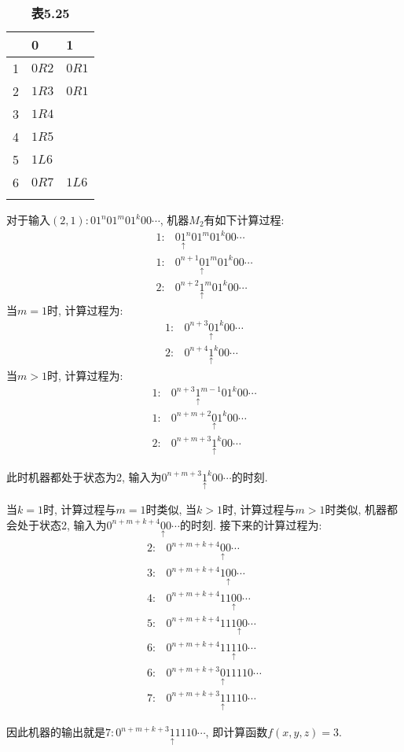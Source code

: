 \begin{table}[H]
\centering
\caption*{\textbf{表5.25}}
\begin{tabularx}{\textwidth}{Y|Y|Y}
\thickhline
&0&1\\
&$0R2$&$0R1$\\
&$1R3$&$0R1$\\
&$1R4$&\\
&$1R5$&\\
&$1L6$&\\
&$0R7$&$1L6$\\
\thickhline
\end{tabularx}
\end{table}

\begin{solution}
对于输入$(2,1):01^n01^m01^k00\cdots$, 机器$M_2$有如下计算过程:
\begin{align}
    1:&0\underset{\uparrow}{1}^n01^m01^k00\cdots\tag{0R1}\\
    1:&0^{n+1}\underset{\uparrow}{0}1^m01^k00\cdots\tag{0R2}\\
    2:&0^{n+2}\underset{\uparrow}{1}^{m}01^k00\cdots\tag{0R1}
\end{align}
当$m=1$时, 计算过程为:
\begin{align}
    1:&0^{n+3}\underset{\uparrow}{0}1^k00\cdots\tag{0R2}\\
    2:&0^{n+4}\underset{\uparrow}{1}^k00\cdots\tag{0R1}
\end{align}
当$m>1$时, 计算过程为:
\begin{align}
    1:&0^{n+3}\underset{\uparrow}{1}^{m-1}01^k00\cdots\tag{0R1}\\
    1:&0^{n+m+2}\underset{\uparrow}{0}1^k00\cdots\tag{0R2}\\
    2:&0^{n+m+3}\underset{\uparrow}{1}^k00\cdots\tag{0R1}
\end{align}

此时机器都处于状态为2, 输入为$0^{n+m+3}\underset{\uparrow}{1}^k00\cdots$的时刻.

当$k=1$时, 计算过程与$m=1$时类似, 当$k>1$时, 计算过程与$m>1$时类似, 机器都会处于状态2, 输入为$0^{n+m+k+4}\underset{\uparrow}{0}0\cdots$的时刻. 接下来的计算过程为:
\begin{align}
    2:&0^{n+m+k+4}\underset{\uparrow}{0}0\cdots\tag{1R3}\\
    3:&0^{n+m+k+4}1\underset{\uparrow}{0}0\cdots\tag{1R4}\\
    4:&0^{n+m+k+4}11\underset{\uparrow}{0}0\cdots\tag{1R5}\\
    5:&0^{n+m+k+4}111\underset{\uparrow}{0}0\cdots\tag{1L6}\\
    6:&0^{n+m+k+4}11\underset{\uparrow}{1}10\cdots\tag{1L6}\\
    6:&0^{n+m+k+3}\underset{\uparrow}{0}11110\cdots\tag{0R7}\\
    7:&0^{n+m+k+3}\underset{\uparrow}{1}1110\cdots\tag{停}
\end{align}

因此机器的输出就是$7:0^{n+m+k+3}\underset{\uparrow}{1}1110\cdots$, 即计算函数$f(x,y,z)=3$.
\end{solution}